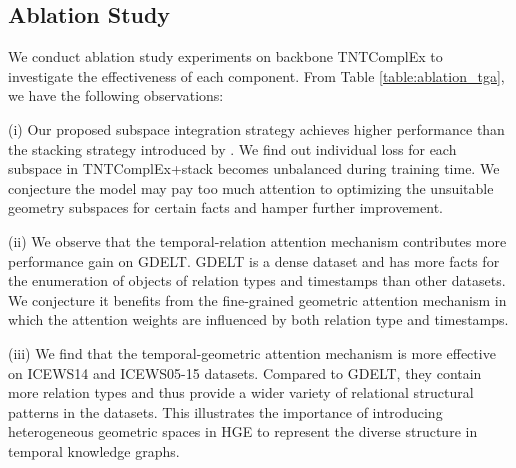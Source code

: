 \documentclass[letterpaper]{article} %
\begin{document}
\subsection{Ablation Study}
We conduct ablation study experiments on backbone TNTComplEx to investigate the effectiveness of each component. From Table \ref{table:ablation_tga}, we have the following observations:


(i) Our proposed subspace integration strategy achieves higher performance than the stacking strategy introduced by \cite{han2020dyernie}. We find out individual loss for each subspace in TNTComplEx+stack becomes unbalanced during training time. We conjecture the model may pay too much attention to optimizing the unsuitable geometry subspaces for certain facts and hamper further improvement.

(ii) We observe that the temporal-relation attention mechanism contributes more performance gain on GDELT. GDELT is a dense dataset and has more facts for the enumeration of objects of relation types and timestamps than other datasets. We conjecture it benefits from the fine-grained geometric attention mechanism in which the attention weights are influenced by both relation type and timestamps.

(iii) We find that the temporal-geometric attention mechanism is more effective on ICEWS14 and ICEWS05-15 datasets. Compared to GDELT, they contain more relation types and thus provide a wider variety of relational structural patterns in the datasets. This illustrates the importance of introducing heterogeneous geometric spaces in HGE to represent the diverse structure in temporal knowledge graphs.

\begin{table}[t!]
\centering
    \caption{
    MRR performance of HGE components. +tra stands for merely using temporal-relational attention mechanism. +tga stands for merely using temporal-geometric attention mechanism. +stack stands for integrating subspaces with the stacking strategy in \cite{han2020dyernie}
    }
    \label{table:ablation_tga}
\end{table}
\end{document}
